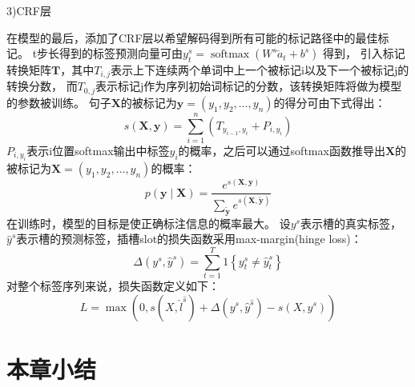 3)CRF层

在模型的最后，添加了CRF层以希望解码得到所有可能的标记路径中的最佳标记。 
t步长得到的标签预测向量可由$y_{t}^{s}=\operatorname{softmax}\left(W^{s} \overleftarrow{a}_{t}+b^{s}\right)$
得到，
引入标记转换矩阵$\mathbf{T}$，其中$T_{i,j}$表示上下连续两个单词中上一个被标记i以及下一个被标记j的转换分数，
而$T_{0,j}$表示标记j作为序列初始词标记的分数，该转换矩阵将做为模型的参数被训练。 
句子$\mathbf{X}$的被标记为$\mathbf{y}=(y_1,y_2,\dots,y_n)$的得分可由下式得出：
\begin{equation}
  s(\mathbf{X}, \mathbf{y})=\sum_{i=1}^{n}\left(T_{y_{i-1}, y_{i}}+P_{i, y_{i}}\right)
\end{equation}
$P_{i, y_{i}}$表示i位置softmax输出中标签$y_{i}$的概率，之后可以通过softmax函数推导出$\mathbf{X}$的被标记为$\mathbf{X}=(y_1,y_2,\dots,y_n)$的概率：
\begin{equation}
  p(\mathbf{y} \mid \mathbf{X})=\frac{e^{s(\mathbf{X}, \mathbf{y})}}{\sum_{\tilde{\mathbf{y}}} e^{s(\mathbf{X}, \tilde{\mathbf{y}})}}
\end{equation}
在训练时，模型的目标是使正确标注信息的概率最大。
设$y^{s}$表示槽的真实标签，$\hat y^{s}$表示槽的预测标签，插槽slot的损失函数采用max-margin(hinge loss)：
\begin{equation}
\Delta\left(y^{s}, \hat{y}^{s}\right)=\sum_{t=1}^{T} 1\left\{y_{t}^{s} \neq \hat{y}_{t}^{s}\right\}
\end{equation}
对整个标签序列来说，损失函数定义如下：
\begin{equation}
L=\max (0, s(X,\hat{l}^{\hat{s}})+\Delta(y^{s}, \hat{y}^{\hat{s}})-s(X,y^{s}))
\end{equation}







\section{本章小结}